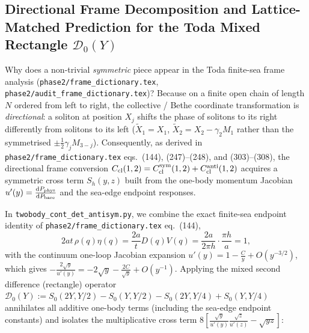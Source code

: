 \documentclass[11pt,a4paper]{article}
\newcommand{\script}[1]{\texttt{#1}}
\newcommand{\dd}{\mathrm{d}}
\begin{document}
\subsection{Directional Frame Decomposition and Lattice-Matched Prediction for the Toda Mixed Rectangle $\mathcal{D}_0(Y)$}

Why does a non-trivial \emph{symmetric} piece appear in the Toda finite-sea frame analysis (\texttt{phase2/frame\_dictionary.tex}, \texttt{phase2/audit\_frame\_dictionary.tex})? Because on a finite open chain of length $N$ ordered from left to right, the collective / Bethe coordinate transformation is \emph{directional}: a soliton at position $X_j$ shifts the phase of solitons to its right differently from solitons to its left ($\tilde X_1=X_1$, $\tilde X_2=X_2-\gamma_2 M_1$ rather than the symmetrised $\pm\frac12\gamma_j M_{3-j}$). Consequently, as derived in \texttt{phase2/frame\_dictionary.tex} eqs.~(144), (247)--(248), and (303)--(308), the directional frame conversion $C_{\rm cl}(1,2)=C_{\rm cl}^{\rm sym}(1,2)+C_{\rm cl}^{\rm anti}(1,2)$ acquires a symmetric cross term $S_h(y,z)$ built from the one-body momentum Jacobian $u'(y)=\frac{\dd P_{\rm phys}}{\dd P_{\rm bare}}$ and the sea-edge endpoint responses.

In \script{twobody\_cont\_det\_antisym.py}, we combine the exact finite-sea endpoint identity of \texttt{phase2/frame\_dictionary.tex} eq.~(144),
\begin{equation}\label{eq:exact_sea_identity}
2at\,\rho(q)\eta(q)=\frac{2a}{t}D(q)V(q)=\frac{2a}{2\pi h}\cdot\frac{\pi h}{a}=1,
\end{equation}
with the continuum one-loop Jacobian expansion $u'(y)=1-\frac{C}{y}+O(y^{-3/2})$, which gives $-\frac{2\sqrt{y}}{u'(y)}=-2\sqrt{y}-\frac{2C}{\sqrt{y}}+O(y^{-1})$. Applying the mixed second difference (rectangle) operator $\mathcal{D}_0(Y):=S_0(2Y,Y/2)-S_0(Y,Y/2)-S_0(2Y,Y/4)+S_0(Y,Y/4)$ annihilates all additive one-body terms (including the sea-edge endpoint constants) and isolates the multiplicative cross term $8\left[\frac{\sqrt{y}}{u'(y)}\frac{\sqrt{z}}{u'(z)}-\sqrt{yz}\right]$:
\end{document}
